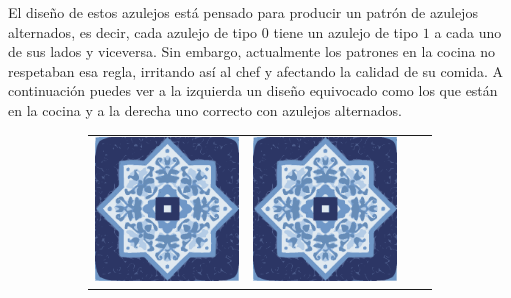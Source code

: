 \documentclass{oci}
\begin{document}
\begin{problemDescription}
El diseño de estos azulejos está pensado para producir un patrón de azulejos
alternados, es decir, cada azulejo de tipo $0$ tiene un azulejo de tipo $1$
a cada uno de sus lados y viceversa.
Sin embargo, actualmente los patrones en la cocina no respetaban esa regla,
irritando así al chef y afectando la calidad de su comida.
A continuación puedes ver a la izquierda un diseño equivocado como los que están
en la cocina y a la derecha uno correcto con azulejos alternados.

\begin{figure}[h]
\setlength{\tabcolsep}{0.5pt}
\begin{subfigure}{0.45\textwidth}
  \begin{center}
    {
      \renewcommand{\arraystretch}{0.25}
      \begin{tabular}{cccc}
        \includegraphics[scale=0.3]{a.eps} &
        \includegraphics[scale=0.3]{a.eps} &

\end{tabular}}
\end{center}
\end{subfigure}
\end{figure}
\end{problemDescription}
\end{document}
